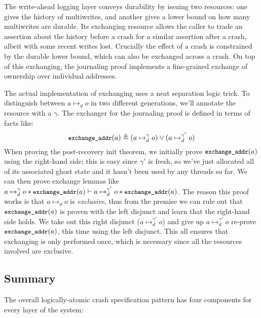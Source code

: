 The write-ahead logging layer conveys durability by issuing two resources: one
gives the history of multiwrites, and another gives a lower bound on how many
multiwrites are durable. Its exchanging resource allows the caller to trade an
assertion about the history before a crash for a similar assertion after a
crash, albeit with some recent writes lost. Crucially the effect of a crash is
constrained by the durable lower bound, which can also be exchanged across a
crash. On top of this exchanging, the journaling proof implements a fine-grained
exchange of ownership over individual addresses.

The actual implementation of exchanging uses a neat separation logic trick. To
distinguish between $a \mapsto_{d} o$ in two different generations, we'll
annotate the resource with a $\gamma$. The exchanger for the journaling proof is
defined in terms of facts like:
\[
  \cc{exchange_addr}(a) \defeq (a \mapsto^{\gamma}_{d} o) \lor (a \mapsto^{\gamma'}_{d} o)
\]
When proving the post-recovery init theorem, we initially prove
$\cc{exchange_addr}(a)$ using the right-hand side; this is easy since $\gamma'$
is fresh, so we've just allocated all of its associated ghost state and it
hasn't been used by any threads so far. We can then prove exchange lemmas like
$a \mapsto^{\gamma}_{d} o \sep \cc{exchange_addr}(a) \proves a \mapsto^{\gamma'}_{d} o \sep \cc{exchange_addr}(a)$.
The reason this proof works is that $a \mapsto_{d} o$ is \emph{exclusive}, thus
from the premise we can rule out that $\cc{exchange_addr}(a)$ is proven with the
left disjunct and learn that the right-hand side holds. We take out this
right disjunct ($a \mapsto^{\gamma'}_{d} o$) and give up
$a \mapsto^{\gamma'}_{d} o$ re-prove $\cc{exchange_addr}(a)$, this time using
the left disjunct. This all ensures that exchanging is only performed once,
which is necessary since all the resources involved are exclusive.


\subsection{Summary}

The overall logically-atomic crash specification pattern has four components for
every layer of the system:


